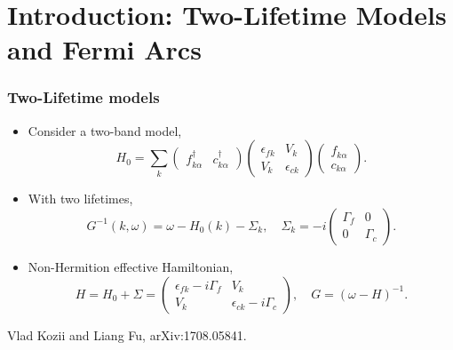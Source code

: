 \documentclass[xcolor=table, 10pt, aspectratio=169]{beamer}
\begin{document}
\section{Introduction: Two-Lifetime Models and Fermi Arcs}

\begin{frame}
\frametitle{Two-Lifetime models}
\begin{itemize}
\item Consider a two-band model,
\[H_0=\sum_k\begin{pmatrix}f_{k\alpha}^\dagger&c_{k\alpha}^\dagger\end{pmatrix}
\begin{pmatrix}\epsilon_{fk} & V_k\\ V_k & \epsilon_{ck}\end{pmatrix}
\begin{pmatrix}f_{k\alpha}\\c_{k\alpha}\end{pmatrix}.\]
\item With two lifetimes,
\[G^{-1}(k,\omega)=\omega-H_0(k)-\Sigma_k,\quad
\Sigma_k=-i\begin{pmatrix}\Gamma_f & 0\\0 & \Gamma_c\end{pmatrix}.\]
\item Non-Hermition effective Hamiltonian,
\[H = H_0+\Sigma = \begin{pmatrix}
\epsilon_{fk} - i\Gamma_f & V_k\\ V_k & \epsilon_{ck} - i\Gamma_c
\end{pmatrix}, \quad G=(\omega-H)^{-1}.\]
\end{itemize}
Vlad Kozii and Liang Fu, arXiv:1708.05841.
\end{frame}
\end{document}

